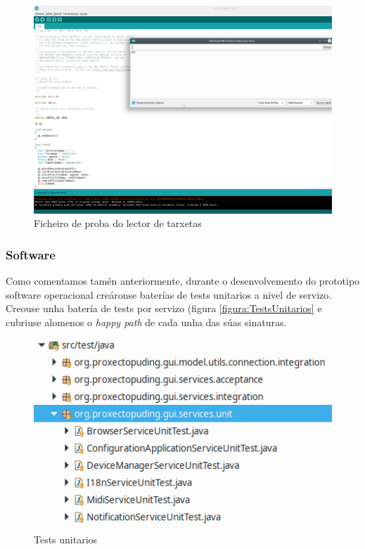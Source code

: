   \begin{figure}[htbp]
   \centering
   \includegraphics[scale=0.8,keepaspectratio=true]{./imagenes/resultado-test-lector-tarxetas.png}
   \caption{Ficheiro de proba do lector de tarxetas}
   \label{figura:ResultadoTestUnitarioLectorTarxetas}
  \end{figure}
  
  \subsubsection{Software}
  
  Como comentamos tamén anteriormente, durante o desenvolvemento do prototipo
  software operacional creáronse baterías de tests unitarios a nivel de
  servizo. \\
  
  Creouse unha batería de tests por servizo (figura \ref{figura:TestsUnitarios}
  e cubriuse alomenos o \textit{happy path} de cada unha das súas sinaturas. \\
  
  \begin{figure}[htbp]
   \centering
   \includegraphics[scale=0.8,keepaspectratio=true]{./imagenes/tests-unitarios.png}
   \caption{Tests unitarios}
   \label{figura:TestUnitarios}
  \end{figure}
  
